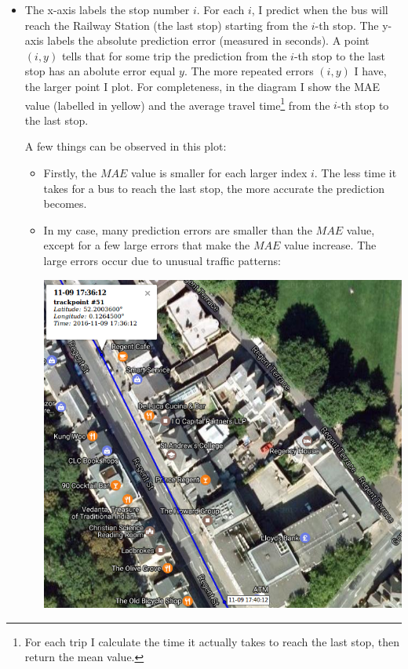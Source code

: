 \documentclass[12pt,a4paper,oneside,openright]{report}
\begin{document}
\begin{itemize}

\item[]
   The x-axis labels the stop number $i$. For each $i$, I predict when the bus
   will reach the Railway Station (the last stop) starting from the $i$-th stop.
   The y-axis labels the absolute prediction error (measured in seconds).
   A point $(i, y)$ tells that for some trip the prediction from the $i$-th stop
   to the last stop has an abolute error equal $y$. The more repeated errors
   $(i, y)$ I have, the larger point I plot. For completeness,
   in the diagram I show the MAE value (labelled in yellow) and the 
   average travel time\footnote{For each trip I calculate the time it actually
   takes to reach the last stop, then return the mean value.} from the $i$-th stop
   to the last stop.

   A few things can be observed in this plot:
   
\begin{itemize} 
   
   \item 
   Firstly, the $MAE$ value is smaller
   for each larger index $i$. The less time it takes for a bus to reach the last
   stop, the more accurate the prediction becomes.

   \item
   In my case, many prediction errors are smaller than the $MAE$ value,
   except for a few large errors that make the $MAE$ value increase. The large errors
   occur due to unusual traffic patterns:

   \includegraphics[scale=0.6]{figs/unusual_pattern.png} \\


\end{itemize}
\end{itemize}
\end{document}
